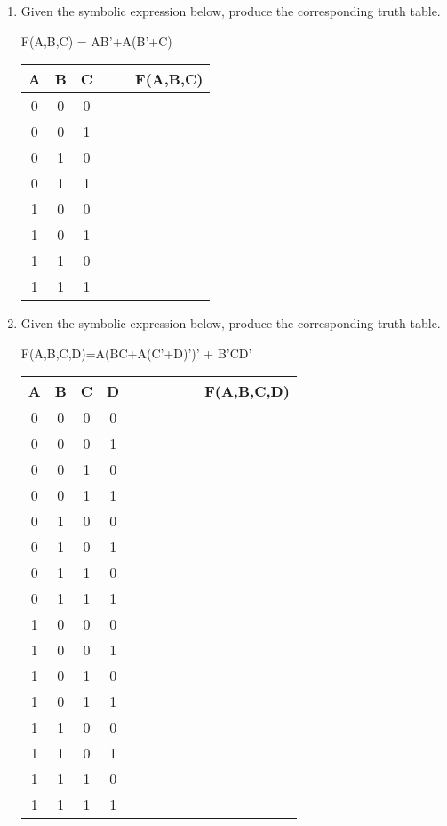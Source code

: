 \begin{enumerate}
\item Given the symbolic expression below, produce the corresponding truth table.

F(A,B,C) = AB'+A(B'+C)
	
	\begin{tabular}{c|c|c|c|c||c}
	A & B & C &   &    &  F(A,B,C) \\ \hline \hline
	0 & 0 & 0 &   &    &    \\ \hline
	0 & 0 & 1 &   &    &    \\ \hline
	0 & 1 & 0 &   &    &    \\ \hline
	0 & 1 & 1 &   &    &    \\ \hline
	1 & 0 & 0 &   &    &    \\ \hline
	1 & 0 & 1 &   &    &    \\ \hline
	1 & 1 & 0 &   &    &    \\ \hline
	1 & 1 & 1 &   &    &    \\
	\end{tabular} 

\item Given the symbolic expression below, produce the corresponding truth table.

F(A,B,C,D)=A(BC+A(C'+D)')' + B'CD' 

\begin{tabular}{c|c|c|c||p{0.1in}|p{0.2in}|p{0.2in}|p{0.2in}|p{0.2in}||c}
	A & B & C & D &   &    &  &  &  & F(A,B,C,D) \\ \hline \hline
	0 & 0 & 0 & 0 &   &    &  &  &  &   \\ \hline
	0 & 0 & 0 & 1 &   &    &  &  &  &   \\ \hline
	0 & 0 & 1 & 0 &   &    &  &  &  &   \\ \hline
	0 & 0 & 1 & 1 &   &    &  &  &  &   \\ \hline
	0 & 1 & 0 & 0 &   &    &  &  &  &   \\ \hline
	0 & 1 & 0 & 1 &   &    &  &  &  &   \\ \hline
	0 & 1 & 1 & 0 &   &    &  &  &  &   \\ \hline
	0 & 1 & 1 & 1 &   &    &  &  &  &   \\ \hline
	1 & 0 & 0 & 0 &   &    &  &  &  &   \\ \hline
	1 & 0 & 0 & 1 &   &    &  &  &  &   \\ \hline
	1 & 0 & 1 & 0 &   &    &  &  &  &   \\ \hline
	1 & 0 & 1 & 1 &   &    &  &  &  &   \\ \hline
	1 & 1 & 0 & 0 &   &    &  &  &  &   \\ \hline
	1 & 1 & 0 & 1 &   &    &  &  &  &   \\ \hline
	1 & 1 & 1 & 0 &   &    &  &  &  &   \\ \hline
	1 & 1 & 1 & 1 &   &    &  &  &  &   \\ 
	\end{tabular} 



\end{enumerate}
